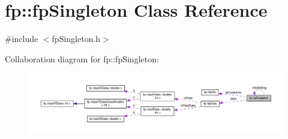 \hypertarget{classfp_1_1fpSingleton}{}\section{fp\+:\+:fp\+Singleton Class Reference}
\label{classfp_1_1fpSingleton}


{\ttfamily \#include $<$fp\+Singleton.\+h$>$}



Collaboration diagram for fp\+:\+:fp\+Singleton\+:
\nopagebreak
\begin{figure}[H]
\begin{center}
\leavevmode
\includegraphics[width=350pt]{classfp_1_1fpSingleton__coll__graph}
\end{center}
\end{figure}
